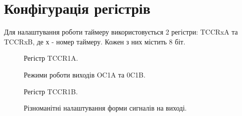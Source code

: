 \section{Конфігурація регістрів}

Для налаштування роботи таймеру використовується 2 регістри: TCCRxA та TCCRxB, де х - номер таймеру. Кожен з них містить 8 біт. \cite{datasheet}

\begin{figure}[h]
\caption{Регістр TCCR1A.}
\label{fig:regA}
\end{figure}
\begin{figure}[h]
\caption{Режими роботи виходів OC1A та 0C1B.}
\label{fig:outputSet}
\end{figure}
\begin{figure}[h]
\caption{Регістр TCCR1B.}
\label{fig:outputSet}
\end{figure}
\begin{figure}[h]
\caption{Різноманітні налаштування форми сигналів на виході.}
\label{fig:waveform}
\end{figure}

